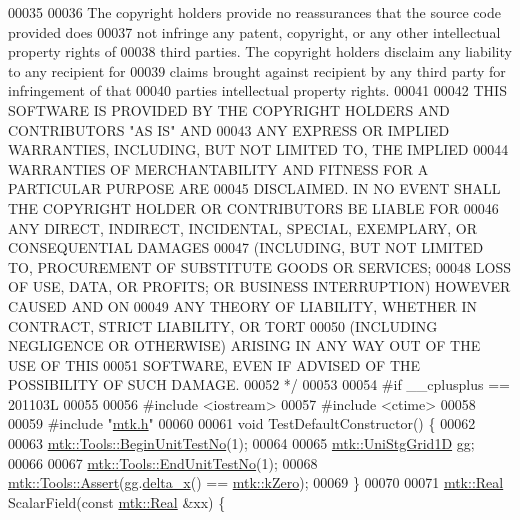 \begin{DoxyCode}
00035 \textcolor{comment}{}
00036 \textcolor{comment}{The copyright holders provide no reassurances that the source code provided does}
00037 \textcolor{comment}{not infringe any patent, copyright, or any other intellectual property rights of}
00038 \textcolor{comment}{third parties. The copyright holders disclaim any liability to any recipient for}
00039 \textcolor{comment}{claims brought against recipient by any third party for infringement of that}
00040 \textcolor{comment}{parties intellectual property rights.}
00041 \textcolor{comment}{}
00042 \textcolor{comment}{THIS SOFTWARE IS PROVIDED BY THE COPYRIGHT HOLDERS AND CONTRIBUTORS "AS IS" AND}
00043 \textcolor{comment}{ANY EXPRESS OR IMPLIED WARRANTIES, INCLUDING, BUT NOT LIMITED TO, THE IMPLIED}
00044 \textcolor{comment}{WARRANTIES OF MERCHANTABILITY AND FITNESS FOR A PARTICULAR PURPOSE ARE}
00045 \textcolor{comment}{DISCLAIMED. IN NO EVENT SHALL THE COPYRIGHT HOLDER OR CONTRIBUTORS BE LIABLE FOR}
00046 \textcolor{comment}{ANY DIRECT, INDIRECT, INCIDENTAL, SPECIAL, EXEMPLARY, OR CONSEQUENTIAL DAMAGES}
00047 \textcolor{comment}{(INCLUDING, BUT NOT LIMITED TO, PROCUREMENT OF SUBSTITUTE GOODS OR SERVICES;}
00048 \textcolor{comment}{LOSS OF USE, DATA, OR PROFITS; OR BUSINESS INTERRUPTION) HOWEVER CAUSED AND ON}
00049 \textcolor{comment}{ANY THEORY OF LIABILITY, WHETHER IN CONTRACT, STRICT LIABILITY, OR TORT}
00050 \textcolor{comment}{(INCLUDING NEGLIGENCE OR OTHERWISE) ARISING IN ANY WAY OUT OF THE USE OF THIS}
00051 \textcolor{comment}{SOFTWARE, EVEN IF ADVISED OF THE POSSIBILITY OF SUCH DAMAGE.}
00052 \textcolor{comment}{*/}
00053 
00054 \textcolor{preprocessor}{#if \_\_cplusplus == 201103L}
00055 
00056 \textcolor{preprocessor}{#include <iostream>}
00057 \textcolor{preprocessor}{#include <ctime>}
00058 
00059 \textcolor{preprocessor}{#include "\hyperlink{mtk_8h}{mtk.h}"}
00060 
00061 \textcolor{keywordtype}{void} TestDefaultConstructor() \{
00062 
00063   \hyperlink{classmtk_1_1Tools_afc29ecaf337a13ed2e817d3890a5a441}{mtk::Tools::BeginUnitTestNo}(1);
00064 
00065   \hyperlink{classmtk_1_1UniStgGrid1D}{mtk::UniStgGrid1D} gg;
00066 
00067   \hyperlink{classmtk_1_1Tools_aba67d9dc35c9c1c49430fcc9ea035e03}{mtk::Tools::EndUnitTestNo}(1);
00068   \hyperlink{classmtk_1_1Tools_ac6804df469c94ab6a796fb64f1e44a89}{mtk::Tools::Assert}(gg.\hyperlink{classmtk_1_1UniStgGrid1D_a6e7173b01241632cf509496d66b9f74c}{delta\_x}() == \hyperlink{group__c01-roots_ga59a451a5fae30d59649bcda274fea271}{mtk::kZero});
00069 \}
00070 
00071 \hyperlink{group__c01-roots_gac080bbbf5cbb5502c9f00405f894857d}{mtk::Real} ScalarField(\textcolor{keyword}{const} \hyperlink{group__c01-roots_gac080bbbf5cbb5502c9f00405f894857d}{mtk::Real} &xx) \{

\end{DoxyCode}
